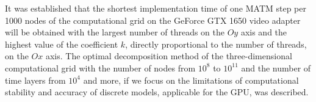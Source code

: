 \documentclass{svproc}
\begin{document}
It was established that the shortest implementation time of one MATM step per 1000 nodes of the computational grid on the GeForce GTX 1650 video adapter will be obtained with the largest number of threads on the $Oy$ axis and the highest value of the coefficient $k$, directly proportional to the number of threads, on the $Ox$ axis.
The optimal decomposition method of the three-dimensional computational grid with the number of nodes from $10^8$ to $10^{11}$ and the number of time layers from $10^4$ and more, if we focus on the limitations of computational stability and accuracy of discrete models, applicable for the GPU, was described.



%
%
\end{document}
